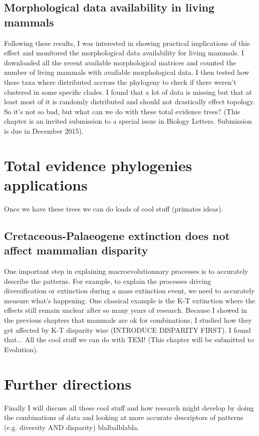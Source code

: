 \subsection{Morphological data availability in living mammals}
Following these results, I was interested in showing practical implications of this effect and monitored the morphological data availability for living mammals.
I downloaded all the recent available morphological matrices and counted the number of living mammals with available morphological data.
I then tested how these taxa where distributed accross the phylogeny to check if there weren't clustered in some specific clades.
I found that a lot of data is missing but that at least most of it is randomly distributed and should not drastically effect topology.
So it's not so bad, but what can we do with these total evidence trees?
(This chapter is an invited submission to a special issue in Biology Letters. Submission is due in December 2015).

\section{Total evidence phylogenies applications}

Once we have these trees we can do loads of cool stuff (primates ideas).

\subsection{Cretaceous-Palaeogene extinction does not affect mammalian disparity}


One important step in explaining macroevolutionnary processes is to accurately describe the patterns.
For example, to explain the processes driving diversification or extinction during a mass extinction event, we need to accurately measure what's happening.
One classical example is the K-T extinction where the effects still remain unclear after so many years of research.
Because I showed in the previous chapters that mammals are ok for combinations, I studied how they get affected by K-T disparity wise (INTRODUCE DISPARITY FIRST).
I found that...
All the cool stuff we can do with TEM!
(This chapter will be submitted to Evolution).

\section{Further directions} %

Finally I will discuss all these cool stuff and how research might develop by doing the combinations of data and looking at more accurate descriptors of patterns (e.g. diversity AND disparity) blalbalblabla.

%